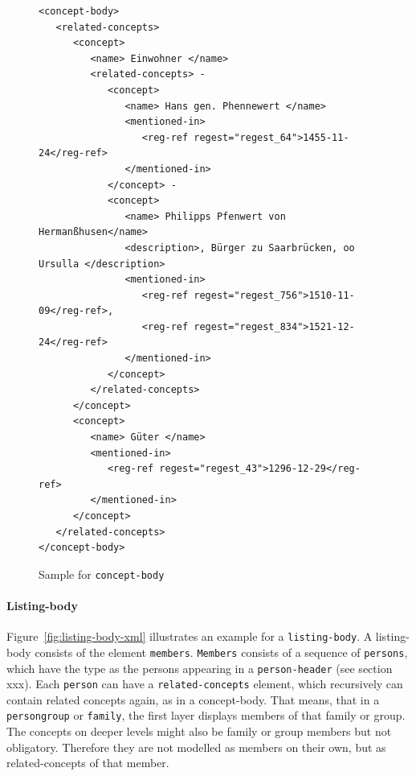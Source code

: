 \begin{figure}[H]
\centering
\begin{verbatim}
<concept-body>
   <related-concepts>
      <concept>
         <name> Einwohner </name>
         <related-concepts> -
            <concept>
               <name> Hans gen. Phennewert </name>
               <mentioned-in>
                  <reg-ref regest="regest_64">1455-11-24</reg-ref>
               </mentioned-in>
            </concept> -
            <concept>
               <name> Philipps Pfenwert von Hermanßhusen</name>
               <description>, Bürger zu Saarbrücken, oo Ursulla </description>
               <mentioned-in>
                  <reg-ref regest="regest_756">1510-11-09</reg-ref>, 
                  <reg-ref regest="regest_834">1521-12-24</reg-ref>
               </mentioned-in>
            </concept>
         </related-concepts>
      </concept>
      <concept>
         <name> Güter </name>
         <mentioned-in>
            <reg-ref regest="regest_43">1296-12-29</reg-ref>
         </mentioned-in>
      </concept>
   </related-concepts>
</concept-body>
\end{verbatim}
\caption{Sample for \texttt{concept-body}}
\label{fig:concept-body-xml}
\end{figure}

\paragraph{Listing-body}
Figure~\ref{fig:listing-body-xml} illustrates an example for a \texttt{listing-body}. A listing-body consists of the element \texttt{members}. \texttt{Members} consists of a sequence of \texttt{persons}, which have the type as the persons appearing in a \texttt{person-header} (see section xxx). Each \texttt{person} can have a \texttt{related-concepts} element, which recursively can contain related concepts again, as in a concept-body.
That means, that in a \texttt{persongroup} or \texttt{family}, the first layer displays members of that family or group. The concepts on deeper levels might also be family or group members but not obligatory. Therefore they are not modelled as members on their own, but as related-concepts of that member.

